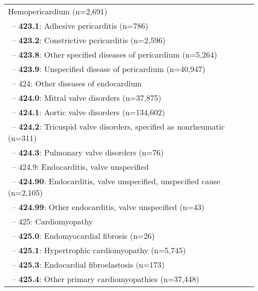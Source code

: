 \begin{longtable}{p{\textwidth}}
Hemopericardium (n=2,691)} \\ \-\ \hspace{30pt}\footnotesize{-- {\color{ForestGreen} \textbf{423.1}}: Adhesive pericarditis (n=786)} \\ \-\ \hspace{30pt}\footnotesize{-- {\color{ForestGreen} \textbf{423.2}}: Constrictive pericarditis (n=2,596)} \\ \-\ \hspace{30pt}\footnotesize{-- {\color{ForestGreen} \textbf{423.8}}: Other specified diseases of pericardium (n=5,264)} \\ \-\ \hspace{30pt}\footnotesize{-- {\color{ForestGreen} \textbf{423.9}}: Unspecified disease of pericardium (n=40,947)} \\ \-\ \hspace{20pt}\footnotesize{-- 424: Other diseases of endocardium} \\ \-\ \hspace{30pt}\footnotesize{-- {\color{ForestGreen} \textbf{424.0}}: Mitral valve disorders (n=37,875)} \\ \-\ \hspace{30pt}\footnotesize{-- {\color{ForestGreen} \textbf{424.1}}: Aortic valve disorders (n=134,602)} \\ \-\ \hspace{30pt}\footnotesize{-- {\color{ForestGreen} \textbf{424.2}}: Tricuspid valve disorders, specified as nonrheumatic (n=311)} \\ \-\ \hspace{30pt}\footnotesize{-- {\color{ForestGreen} \textbf{424.3}}: Pulmonary valve disorders (n=76)} \\ \-\ \hspace{30pt}\footnotesize{-- 424.9: Endocarditis, valve unspecified} \\ \-\ \hspace{40pt}\footnotesize{-- {\color{ForestGreen} \textbf{424.90}}: Endocarditis, valve unspecified, unspecified cause (n=2,105)} \\ \-\ \hspace{40pt}\footnotesize{-- {\color{ForestGreen} \textbf{424.99}}: Other endocarditis, valve unspecified (n=43)} \\ \-\ \hspace{20pt}\footnotesize{-- 425: Cardiomyopathy} \\ \-\ \hspace{30pt}\footnotesize{-- {\color{ForestGreen} \textbf{425.0}}: Endomyocardial fibrosis (n=26)} \\ \-\ \hspace{30pt}\footnotesize{-- {\color{ForestGreen} \textbf{425.1}}: Hypertrophic cardiomyopathy (n=5,745)} \\ \-\ \hspace{30pt}\footnotesize{-- {\color{ForestGreen} \textbf{425.3}}: Endocardial fibroelastosis (n=173)} \\ \-\ \hspace{30pt}\footnotesize{-- {\color{ForestGreen} \textbf{425.4}}: Other primary cardiomyopathies (n=37,448)} 
\end{longtable}
